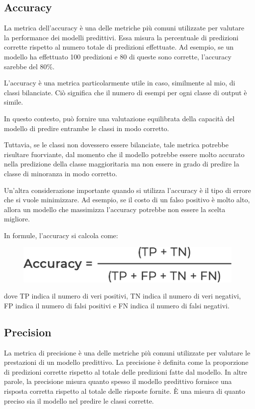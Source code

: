 \subsection{Accuracy}
La metrica dell'accuracy è una delle metriche più comuni utilizzate per valutare la performance dei modelli predittivi. Essa misura la percentuale di predizioni corrette rispetto al numero totale di predizioni effettuate. Ad esempio, se un modello ha effettuato 100 predizioni e 80 di queste sono corrette, l'accuracy sarebbe del 80\%.

L'accuracy è una metrica particolarmente utile in caso, similmente al mio, di classi bilanciate. Ciò significa che il numero di esempi per ogni classe di output è simile. 

In questo contesto, può fornire una valutazione equilibrata della capacità del modello di predire entrambe le classi in modo corretto. 

Tuttavia, se le classi  non dovessero essere bilanciate, tale metrica potrebbe risultare fuorviante, dal momento che il modello potrebbe essere molto accurato nella predizione della classe maggioritaria ma non essere in grado di predire la classe di minoranza in modo corretto.

Un'altra considerazione importante quando si utilizza l'accuracy è il tipo di errore che si vuole minimizzare. Ad esempio, se il costo di un falso positivo è molto alto, allora un modello che massimizza l'accuracy potrebbe non essere la scelta migliore.

In formule, l'accuracy si calcola come:

\begin{figure}
    \begin{center}    
        \includegraphics[width=0.9\linewidth]{images/image47.png}
    \end{center}
\end{figure}

dove TP indica il numero di veri positivi, TN indica il numero di veri negativi, FP indica il numero di falsi positivi e FN indica il numero di falsi negativi.

\subsection{Precision}
La metrica di precisione è una delle metriche più comuni utilizzate per valutare le prestazioni di un modello predittivo. La precisione è definita come la proporzione di predizioni corrette rispetto al totale delle predizioni fatte dal modello. In altre parole, la precisione misura quanto spesso il modello predittivo fornisce una risposta corretta rispetto al totale delle risposte fornite. È una misura di quanto preciso sia il modello nel predire le classi corrette.

